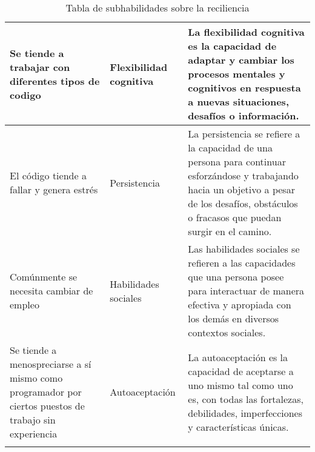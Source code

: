 \begin{longtable}{|p{6cm}|p{3cm}|p{8cm}|}
\\
\hline
Se tiende a trabajar con diferentes tipos de codigo
&
Flexibilidad cognitiva
 & 
La flexibilidad cognitiva es la capacidad de adaptar y cambiar los procesos mentales y cognitivos en respuesta a nuevas situaciones, desafíos o información.
\\
\hline
El código tiende a fallar y genera estrés

&
Persistencia & 
La persistencia se refiere a la capacidad de una persona para continuar esforzándose y trabajando hacia un objetivo a pesar de los desafíos, obstáculos o fracasos que puedan surgir en el camino.

\\
\hline
Comúnmente se necesita cambiar de empleo

&
Habilidades sociales

 & 
Las habilidades sociales se refieren a las capacidades que una persona posee para interactuar de manera efectiva y apropiada con los demás en diversos contextos sociales.

\\
\hline
 Se tiende a menospreciarse a sí mismo como programador por ciertos puestos de trabajo sin experiencia

&
Autoaceptación
 & 
La autoaceptación es la capacidad de aceptarse a uno mismo tal como uno es, con todas las fortalezas, debilidades, imperfecciones y características únicas. 



\\
\hline

\caption{Tabla de subhabilidades sobre la reciliencia}
\label{tab:estudios}
\end{longtable}


